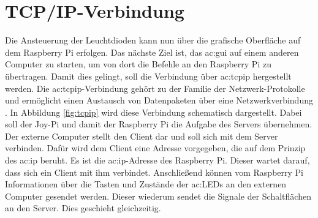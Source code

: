 \section{TCP/IP-Verbindung}
Die Ansteuerung der Leuchtdioden kann nun über die grafische Oberfläche auf dem Raspberry Pi erfolgen. Das nächste Ziel ist, das \gls{ac:gui} auf einem anderen Computer zu starten, um von dort die Befehle an den Raspberry Pi zu übertragen. Damit dies gelingt, soll die Verbindung über \gls{ac:tcpip} hergestellt werden. Die \gls{ac:tcpip}-Verbindung  gehört zu der Familie der Netzwerk-Protokolle und ermöglicht einen Austausch von Datenpaketen über eine Netzwerkverbindung  \cite{latex:tcpip}.
In Abbildung \ref{fig:tcpip} wird diese Verbindung schematisch dargestellt. Dabei soll der Joy-Pi und damit der Raspberry Pi die Aufgabe des Servers übernehmen. Der externe Computer stellt den Client dar und soll sich mit dem Server verbinden. Dafür wird dem Client eine Adresse vorgegeben, die auf dem Prinzip des \gls{ac:ip} beruht. Es ist die \gls{ac:ip}-Adresse des Raspberry Pi. Dieser wartet darauf, dass sich ein Client mit ihm verbindet. Anschließend können vom Raspberry Pi Informationen über die Tasten und Zustände der \gls{ac:LED}s an den externen Computer gesendet werden. Dieser wiederum sendet die Signale der Schaltflächen an den Server. Dies geschieht gleichzeitig.
\begin{figure}[H] %
\end{figure} %



